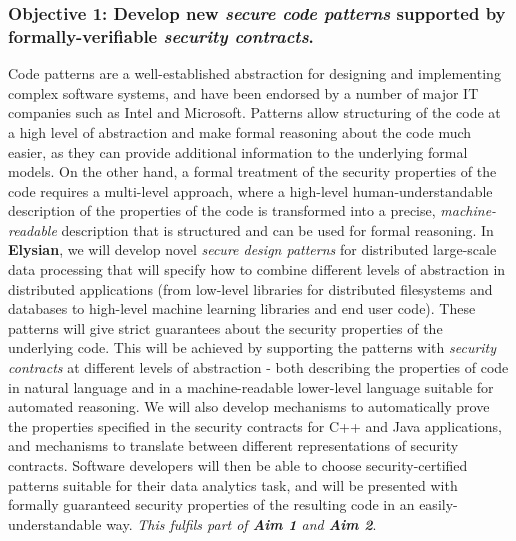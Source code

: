 \documentclass[a4paper,11pt]{article}
\newcommand{\project}[1]{\textbf{#1}\xspace}
\newcommand{\SECURITY}{\project{Elysian}}
\newcommand{\TheProject}{\SECURITY}
\begin{document}
\subsubsection*{Objective 1: Develop new \emph{secure code patterns} supported by formally-verifiable \emph{security contracts}.}
\vspace{-6pt}
Code patterns are a well-established abstraction for designing and implementing complex software systems, and have been endorsed by a number of major IT companies such as Intel and Microsoft. Patterns allow structuring of the code at a high level of abstraction and make formal reasoning about the code much easier, as they can provide additional information to the underlying formal models. On the other hand, a formal treatment of the security properties of the code requires a multi-level approach, where a high-level human-understandable description of the properties of the code is transformed into a precise, \emph{machine-readable} description that is structured and can be used for formal reasoning. In \TheProject{}, we will develop novel \emph{secure design patterns} for distributed large-scale data processing that will specify how to combine different levels of abstraction in distributed applications (from low-level libraries for distributed filesystems and databases to high-level machine learning libraries and end user code). These patterns will give strict guarantees about the security properties of the underlying code. This will be achieved by supporting the patterns with \emph{security contracts} at different levels of abstraction - both describing the properties of code in natural language and in a machine-readable lower-level language suitable for automated reasoning. We will also develop mechanisms to automatically prove the properties specified in the security contracts for C++ and Java applications, and mechanisms to translate between different representations of security contracts. Software developers will then be able to choose security-certified patterns suitable for their data analytics task, and will be presented with formally guaranteed security properties of the resulting code in an easily-understandable way. \emph{This fulfils part of \textbf{Aim 1} and \textbf{Aim 2}}.
\end{document}
